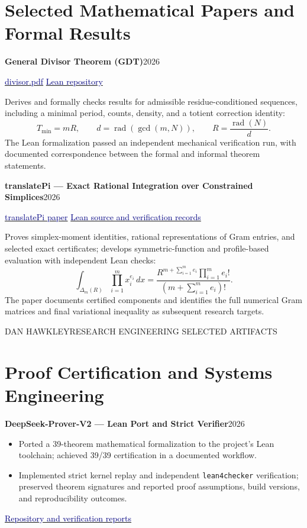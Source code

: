\documentclass[10pt,letterpaper]{article}
\newcommand{\entry}[2]{\textbf{#1}\hfill {\small\color{muted}#2}\par}
\newcommand{\site}[2]{\href{#1}{\textcolor{navy}{#2}}}
\newcommand{\subline}[1]{{\small\color{muted}#1}\par}
\begin{document}
\section*{Selected Mathematical Papers and Formal Results}
\entry{General Divisor Theorem (GDT)}{2026}
\subline{\site{https://goodmath.app/divisor.pdf}{divisor.pdf} \textbar{} \site{https://github.com/thinkthoughts/general-divisor-theorem}{Lean repository}}
Derives and formally checks results for admissible residue-conditioned sequences, including a minimal period, counts, density, and a totient correction identity:
\[
T_{\min}=mR,\qquad d=\operatorname{rad}(\gcd(m,N)),\qquad
R=\frac{\operatorname{rad}(N)}{d}.
\]
The Lean formalization passed an independent mechanical verification run, with documented correspondence between the formal and informal theorem statements.

\entry{translatePi --- Exact Rational Integration over Constrained Simplices}{2026}
\subline{\site{https://translatepi.ai/main.pdf}{translatePi paper} \textbar{} \site{https://github.com/thinkthoughts/lean-bgp212}{Lean source and verification records}}
Proves simplex-moment identities, rational representations of Gram entries, and selected exact certificates; develops symmetric-function and profile-based evaluation with independent Lean checks:
\[
\int_{\Delta_m(R)}\prod_{i=1}^{m}x_i^{e_i}\,dx
=\frac{R^{m+\sum_{i=1}^{m}e_i}\prod_{i=1}^{m}e_i!}
{\left(m+\sum_{i=1}^{m}e_i\right)!}.
\]
The paper documents certified components and identifies the full numerical Gram matrices and final variational inequality as subsequent research targets.

\newpage
{\small\color{muted}DAN HAWKLEY\hfill RESEARCH ENGINEERING \textbar{} SELECTED ARTIFACTS}\par
\vspace{0.25em}
\section*{Proof Certification and Systems Engineering}
\entry{DeepSeek-Prover-V2 --- Lean Port and Strict Verifier}{2026}
\begin{itemize}
  \item Ported a 39-theorem mathematical formalization to the project's Lean toolchain; achieved 39/39 certification in a documented workflow.
  \item Implemented strict kernel replay and independent \texttt{lean4checker} verification; preserved theorem signatures and reported proof assumptions, build versions, and reproducibility outcomes.
\end{itemize}
\subline{\site{https://github.com/thinkthoughts/DeepSeek-Prover-V2}{Repository and verification reports}}
\end{document}
